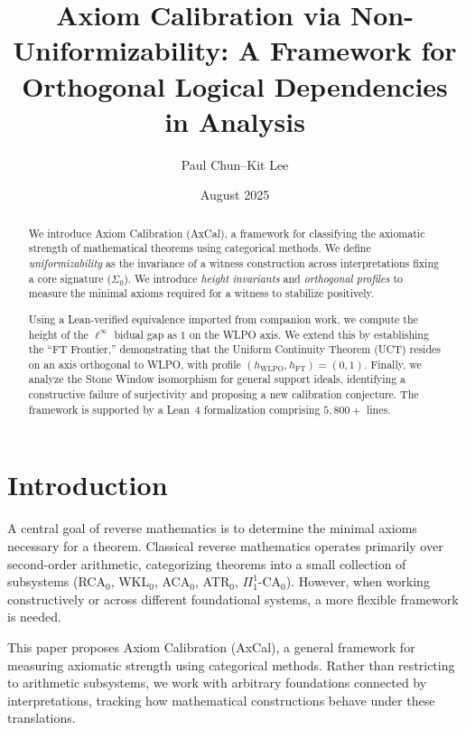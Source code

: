 \documentclass[11pt]{article}
\title{Axiom Calibration via Non-Uniformizability: A Framework for Orthogonal Logical Dependencies in Analysis}
\author{Paul Chun--Kit Lee}
\date{August 2025}
\newcommand{\SigmaZero}{\Sigma_{0}}
\newcommand{\linf}{\ell^\infty}
\begin{document}
\maketitle

\begin{abstract}
We introduce Axiom Calibration (AxCal), a framework for classifying the axiomatic strength of mathematical theorems using categorical methods. We define \emph{uniformizability} as the invariance of a witness construction across interpretations fixing a core signature ($\SigmaZero$). We introduce \emph{height invariants} and \emph{orthogonal profiles} to measure the minimal axioms required for a witness to stabilize positively.

Using a Lean-verified equivalence imported from companion work, we compute the height of the $\linf$ bidual gap as $1$ on the WLPO axis. We extend this by establishing the ``FT Frontier,'' demonstrating that the Uniform Continuity Theorem (UCT) resides on an axis orthogonal to WLPO, with profile $(h_{\text{WLPO}}, h_{\text{FT}}) = (0,1)$. Finally, we analyze the Stone Window isomorphism for general support ideals, identifying a constructive failure of surjectivity and proposing a new calibration conjecture. The framework is supported by a Lean~4 formalization comprising $5{,}800+$ lines.
\end{abstract}

\tableofcontents

\section{Introduction}

A central goal of reverse mathematics is to determine the minimal axioms necessary for a theorem. Classical reverse mathematics operates primarily over second-order arithmetic, categorizing theorems into a small collection of subsystems (RCA$_0$, WKL$_0$, ACA$_0$, ATR$_0$, $\Pi^1_1$-CA$_0$). However, when working constructively or across different foundational systems, a more flexible framework is needed.

This paper proposes Axiom Calibration (AxCal), a general framework for measuring axiomatic strength using categorical methods. Rather than restricting to arithmetic subsystems, we work with arbitrary foundations connected by interpretations, tracking how mathematical constructions behave under these translations.
\end{document}
